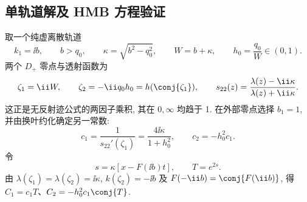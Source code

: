 \subsection{单轨道解及 HMB 方程验证}
取一个纯虚离散轨道
\begin{equation}\label{eq:imaginarypoint}
k_1=\ii b,\qquad b>q_0,\qquad
\kappa=\sqrt{b^2-q_0^2},\qquad W=b+\kappa,\qquad h_0=\dfrac{q_0}{W}\in(0,1).
\end{equation}
两个 $D_+$ 零点与透射函数为
\begin{equation}\label{eq:onezeros}
\zeta_1=\ii W,\qquad \zeta_2=-\ii q_0h_0=h(\conj{\zeta_1}),\qquad
s_{22}(z)=\dfrac{\lambda(z)-\ii\kappa}{\lambda(z)+\ii\kappa}.
\end{equation}
这正是无反射迹公式的两因子乘积, 其在 $0,\infty$ 均趋于 1. 在外部零点选择 $b_1=1$, 并由换叶约化确定另一常数:
\begin{equation}\label{eq:onec}
c_1=\dfrac{1}{s_{22}'(\zeta_1)}=\dfrac{4\ii\kappa}{1+h_0^2},\qquad
c_2=-h_0^2c_1.
\end{equation}
令
\begin{equation}\label{eq:orbit-phase}
s=\kappa[x-F(\ii b)t],\qquad T=e^{2s}.
\end{equation}
由 $\lambda(\zeta_1)=\lambda(\zeta_2)=\ii\kappa$, $k(\zeta_2)=-\ii b$ 及 $F(-\ii b)=\conj{F(\ii b)}$, 得 $C_1=c_1T$、$C_2=-h_0^2c_1\conj{T}$.

